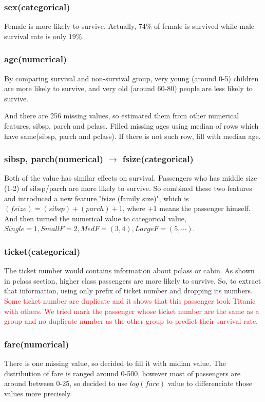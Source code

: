 \documentclass{article}
\begin{document}
\subsubsection*{sex(categorical)}
Female is more likely to survive.
Actually, $74\%$ of female is survived while male survival rate is only $19\%$.

\subsubsection*{age(numerical)}
By comparing survival and non-survival group, very young (around 0-5) children are more likely to survive, and very old (around 60-80) people are less likely to survive.

And there are 256 missing values, so estimated them from other numerical features, sibsp, parch and pclass.
Filled missing ages using median of rows which have same(sibsp, parch and pclass).
If there is not such row, fill with median age.

\subsubsection*{sibsp, parch(numerical) $\rightarrow$ fsize(categorical)}
Both of the value has similar effects on survival.
Passengers who has middle size (1-2) of sibsp/parch are more likely to survive.
So combined these two features and introduced a new feature "fsize (family size)", which is $(fsize) = (sibsp)+(parch) +1$, where $+1$ means the passenger himself.
And then turned the numerical value to categorical value,
$Single=1, SmallF=2, MedF=(3,4), LargeF=(5,\cdots)$.

\subsubsection*{ticket(categorical)}
The ticket number would contains information about pclass or cabin.
As shown in pclass section, higher class passengers are more likely to survive.
So, to extract that information, using only prefix of ticket number and dropping its numbers. 
\textcolor{red}{Some ticket number are duplicate and it shows that this passenger took Titanic with others. We tried mark the passenger whose ticket number are the same as a group and no duplicate number as the other group to predict their survival rate.}

\subsubsection*{fare(numerical)}
There is one missing value, so decided to fill it with midian value.
The distribution of fare is ranged around 0-500, however most of passengers are around between 0-25, so decided to use $log(fare)$ value to differenciate those values more precisely.
\end{document}
